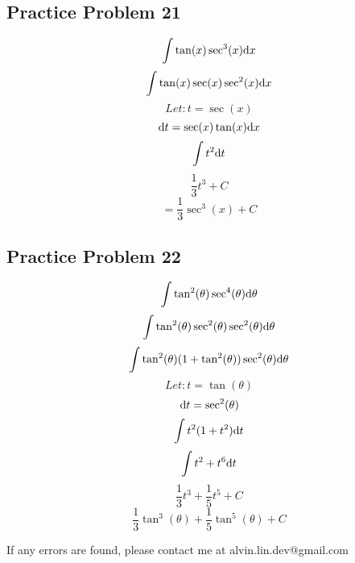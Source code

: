 \documentclass[letterpaper, 12pt]{math}
\begin{document}
\subsection*{Practice Problem 21}
\[ \int{\tan(x)\sec^{3}(x)\mathrm{d}{x}} \]
\[ \int{\tan(x)\sec(x)\sec^{2}(x)\mathrm{d}{x}} \]
\[ Let: t = \sec(x) \]
\[ \mathrm{d}{t} = \sec(x)\tan(x)\mathrm{d}{x} \]
\[ \int{t^{2}\mathrm{d}{t}} \]
\[ \frac{1}{3}t^{3}+C \]
\[ = \frac{1}{3}\sec^{3}(x)+C \]

\subsection*{Practice Problem 22}
\[ \int{\tan^{2}(\theta)\sec^{4}(\theta)\mathrm{d}{\theta}} \]
\[ \int{\tan^{2}(\theta)\sec^{2}(\theta)\sec^{2}(\theta)\mathrm{d}{\theta}} \]
\[ \int{\tan^{2}(\theta)(1+\tan^{2}(\theta))\sec^{2}(\theta)\mathrm{d}{\theta}} \]
\[ Let: t = \tan(\theta) \]
\[ \mathrm{d}{t} = \sec^{2}(\theta) \]
\[ \int{t^{2}(1+t^{2})\mathrm{d}{t}} \]
\[ \int{t^{2}+t^{6}\mathrm{d}{t}} \]
\[ \frac{1}{3}t^{3}+\frac{1}{5}t^{5}+C \]
\[ \frac{1}{3}\tan^{3}(\theta)+\frac{1}{5}\tan^{5}(\theta)+C \]

\begin{center}
  If any errors are found, please contact me at alvin.lin.dev@gmail.com
\end{center}
\end{document}
